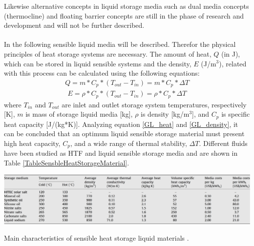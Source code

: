 \documentclass[Master,MEE,english]{twbook}%
\begin{document}
Likewise alternative concepts in liquid storage media such as dual media concepts (thermocline) and floating barrier concepts are still in the phase of research and development and will not be further described.\cite{Steinmann2015} \\
\\
In the following sensible liquid media will be described. Therefor the physical principles of heat storage systems are necessary. The amount of heat, $Q$ (in J), which can be stored in liquid sensible systems and the density, $E$ (J/m$^3$), related with this process can be calculated using the following equations:
\begin{align}
Q=m*C_p*(T_{out}-T_{in})=m*C_p*\Delta T \label{GL_heat}
\end{align}
\begin{align}
E=\rho*C_p*(T_{out}-T_{in})=\rho*C_p*\Delta T \label{GL_density}
\end{align}
where $T_{in}$ and $T_{out}$ are inlet and outlet storage system temperatures, respectively [K], $m$ is mass of storage liquid media [kg], $\rho$ is density [kg/m$^3$], and $C_p$ is specific heat capacity [J/(kg*K)]. Analyzing equation \ref{GL_heat} and \ref{GL_density}, it can be concluded that an optimum liquid sensible storage material must present high heat capacity, $C_p$, and a wide range of thermal stability, $\Delta T$. Different fluids have been studied as HTF and liquid sensible storage media \cite{Gil2010} and are shown in Table \ref{TableSensbleHeatStorageMaterial}. \cite{Ushak2015}
\begin{table}[h]
\centering
\includegraphics[width=1\textwidth]{FIG/TableSensbleHeatStorageMaterial}
\caption[Main characteristics of sensible heat storage liquid materials.]{Main characteristics of sensible heat storage liquid materials \cite{Gil2010}.}\label{TableSensbleHeatStorageMaterial}
\end{table}
\end{document}
